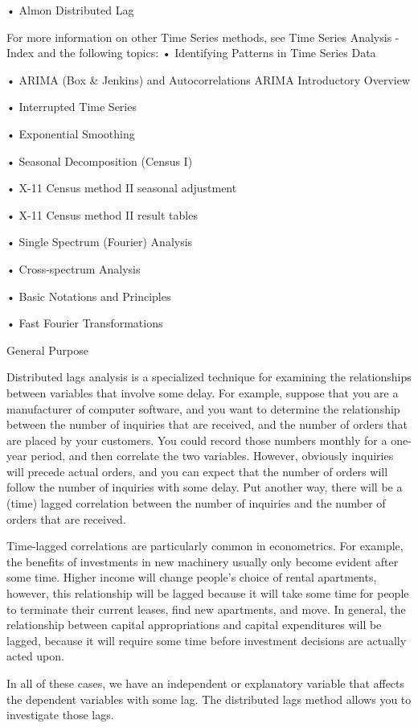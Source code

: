 •
Almon Distributed Lag


For more information on other Time Series methods, see Time Series Analysis - Index and the following topics:
•
Identifying Patterns in Time Series Data

•
ARIMA (Box & Jenkins) and Autocorrelations ARIMA Introductory Overview

•
Interrupted Time Series

•
Exponential Smoothing

•
Seasonal Decomposition (Census I)

•
X-11 Census method II seasonal adjustment

•
X-11 Census method II result tables

•
Single Spectrum (Fourier) Analysis

•
Cross-spectrum Analysis

•
Basic Notations and Principles

•
Fast Fourier Transformations



General Purpose

Distributed lags analysis is a specialized technique for examining the relationships between variables that involve some delay. For example, suppose that you are a manufacturer of computer software, and you want to determine the relationship between the number of inquiries that are received, and the number of orders that are placed by your customers. You could record those numbers monthly for a one-year period, and then correlate the two variables. However, obviously inquiries will precede actual orders, and you can expect that the number of orders will follow the number of inquiries with some delay. Put another way, there will be a (time) lagged correlation between the number of inquiries and the number of orders that are received.

Time-lagged correlations are particularly common in econometrics. For example, the benefits of investments in new machinery usually only become evident after some time. Higher income will change people's choice of rental apartments, however, this relationship will be lagged because it will take some time for people to terminate their current leases, find new apartments, and move. In general, the relationship between capital appropriations and capital expenditures will be lagged, because it will require some time before investment decisions are actually acted upon.

In all of these cases, we have an independent or explanatory variable that affects the dependent variables with some lag. The distributed lags method allows you to investigate those lags.

